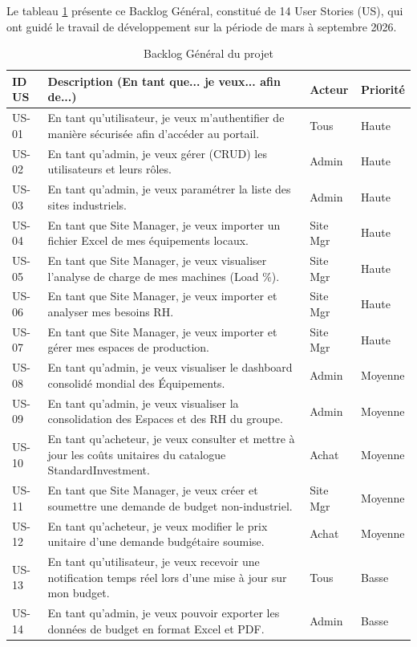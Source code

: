 Le tableau \ref{tab:backlog} présente ce Backlog Général, constitué de 14 User Stories (US), qui ont guidé le travail de développement sur la période de mars à septembre 2026.

\begin{table}[h]
\centering
\begin{tabular}{|p{2cm}|p{8cm}|p{2cm}|p{2cm}|}
\hline
\textbf{ID US} & \textbf{Description (En tant que... je veux... afin de...)} & \textbf{Acteur} & \textbf{Priorité} \\ \hline
US-01 & En tant qu'utilisateur, je veux m'authentifier de manière sécurisée afin d'accéder au portail. & Tous & Haute \\ \hline
US-02 & En tant qu'admin, je veux gérer (CRUD) les utilisateurs et leurs rôles. & Admin & Haute \\ \hline
US-03 & En tant qu'admin, je veux paramétrer la liste des sites industriels. & Admin & Haute \\ \hline
US-04 & En tant que Site Manager, je veux importer un fichier Excel de mes équipements locaux. & Site Mgr & Haute \\ \hline
US-05 & En tant que Site Manager, je veux visualiser l'analyse de charge de mes machines (Load \%). & Site Mgr & Haute \\ \hline
US-06 & En tant que Site Manager, je veux importer et analyser mes besoins RH. & Site Mgr & Haute \\ \hline
US-07 & En tant que Site Manager, je veux importer et gérer mes espaces de production. & Site Mgr & Haute \\ \hline
US-08 & En tant qu'admin, je veux visualiser le dashboard consolidé mondial des Équipements. & Admin & Moyenne \\ \hline
US-09 & En tant qu'admin, je veux visualiser la consolidation des Espaces et des RH du groupe. & Admin & Moyenne \\ \hline
US-10 & En tant qu'acheteur, je veux consulter et mettre à jour les coûts unitaires du catalogue StandardInvestment. & Achat & Moyenne \\ \hline
US-11 & En tant que Site Manager, je veux créer et soumettre une demande de budget non-industriel. & Site Mgr & Moyenne \\ \hline
US-12 & En tant qu'acheteur, je veux modifier le prix unitaire d'une demande budgétaire soumise. & Achat & Moyenne \\ \hline
US-13 & En tant qu'utilisateur, je veux recevoir une notification temps réel lors d'une mise à jour sur mon budget. & Tous & Basse \\ \hline
US-14 & En tant qu'admin, je veux pouvoir exporter les données de budget en format Excel et PDF. & Admin & Basse \\ \hline
\end{tabular}
\caption{Backlog Général du projet}
\label{tab:backlog}
\end{table}

